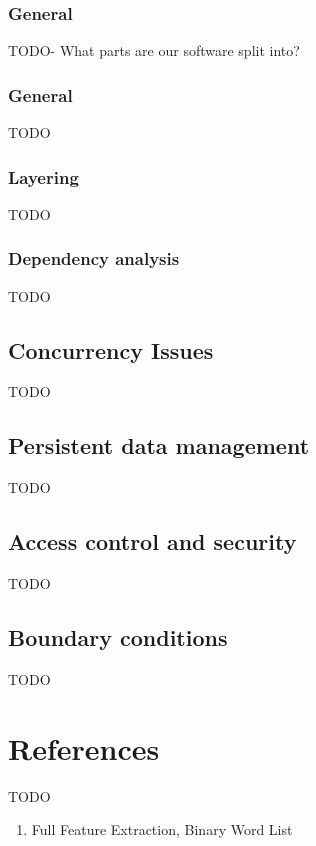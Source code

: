 \documentclass{report}
\begin{document}
\subsection{General}
TODO- What parts are our software split into? 

\subsection{General}
TODO

\subsection{Layering}
TODO

\subsection{Dependency analysis}
TODO


\section{Concurrency Issues}
TODO

\section{Persistent data management}
TODO

\section{Access control and security}
TODO

\section{Boundary conditions}
TODO


\chapter{References}
TODO

\begin{enumerate}
    \item Full Feature Extraction, Binary Word List
\end{enumerate}





\nocite{*}

\appendix
\end{document}
